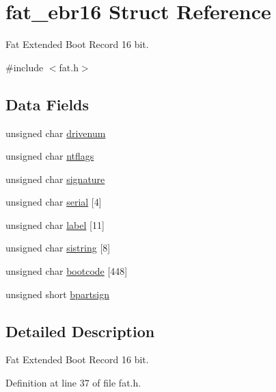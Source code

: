 \hypertarget{structfat__ebr16}{}\section{fat\+\_\+ebr16 Struct Reference}
\label{structfat__ebr16}


Fat Extended Boot Record 16 bit.  




{\ttfamily \#include $<$fat.\+h$>$}

\subsection*{Data Fields}
\begin{DoxyCompactItemize}
\item 
unsigned char \hyperlink{structfat__ebr16_ab9688e94858a4b8df6d7d1c937df5d6c_ab9688e94858a4b8df6d7d1c937df5d6c}{drivenum}
\item 
unsigned char \hyperlink{structfat__ebr16_a90f6b7d2156bc0f3d709e82c08a1cad4_a90f6b7d2156bc0f3d709e82c08a1cad4}{ntflags}
\item 
unsigned char \hyperlink{structfat__ebr16_a366424b6b0e4cc2cc3a48fb291cdddf1_a366424b6b0e4cc2cc3a48fb291cdddf1}{signature}
\item 
unsigned char \hyperlink{structfat__ebr16_a9f3f3907a47eab25db8ffaacf339848f_a9f3f3907a47eab25db8ffaacf339848f}{serial} \mbox{[}4\mbox{]}
\item 
unsigned char \hyperlink{structfat__ebr16_ab9e42cf63e22b01e07ce6755d66ed8f3_ab9e42cf63e22b01e07ce6755d66ed8f3}{label} \mbox{[}11\mbox{]}
\item 
unsigned char \hyperlink{structfat__ebr16_a1008703850aab97e1aa8ae5ea8511ab1_a1008703850aab97e1aa8ae5ea8511ab1}{sistring} \mbox{[}8\mbox{]}
\item 
unsigned char \hyperlink{structfat__ebr16_af996668104b02930035855902e5c842b_af996668104b02930035855902e5c842b}{bootcode} \mbox{[}448\mbox{]}
\item 
unsigned short \hyperlink{structfat__ebr16_a810bdda9447bbe4dc1ce2f232d18ee30_a810bdda9447bbe4dc1ce2f232d18ee30}{bpartsign}
\end{DoxyCompactItemize}


\subsection{Detailed Description}
Fat Extended Boot Record 16 bit. 

Definition at line 37 of file fat.\+h.



